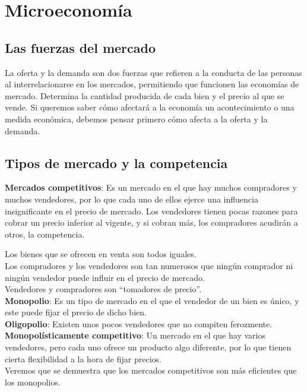 \documentclass{report}
\begin{document}
\chapter{Microeconomía}

\section{Las fuerzas del mercado}

La oferta y la demanda son dos fuerzas que refieren a la conducta de las personas al interrelacionarse en los mercados, permitiendo que funcionen las economías de mercado. Determina la cantidad producida de cada bien y el precio al que se vende. Si queremos saber cómo afectará a la economía un acontecimiento o una medida económica, debemos pensar primero cómo afecta a la oferta y la demanda.

\section{Tipos de mercado y la competencia}

\textbf{Mercados competitivos}: Es un mercado en el que hay muchos compradores y muchos vendedores, por lo que cada uno de ellos ejerce una influencia insignificante en el precio de mercado. Los vendedores tienen pocas razones para cobrar un precio inferior al vigente, y si cobran más, los compradores acudirán a otros, la competencia.

Los bienes que se ofrecen en venta son todos iguales.\\
Los compradores y los vendedores son tan numerosos que ningún comprador ni ningún vendedor puede influir en el precio de mercado. \\
Vendedores y compradores son “tomadores de precio”. \\

\textbf{Monopolio}: Es un tipo de mercado en el que el vendedor de un bien es único, y este puede fijar el precio de dicho bien. \\

\textbf{Oligopolio}:  Existen unos pocos vendedores que no compiten ferozmente.\\

\textbf{Monopolísticamente competitivo}: Un mercado en el que hay varios vendedores, pero cada uno ofrece un producto algo diferente, por lo que tienen cierta flexibilidad a la hora de fijar precios. \\

Veremos que se demuestra que los mercados competitivos son más eficientes que los monopolios.
\end{document}
